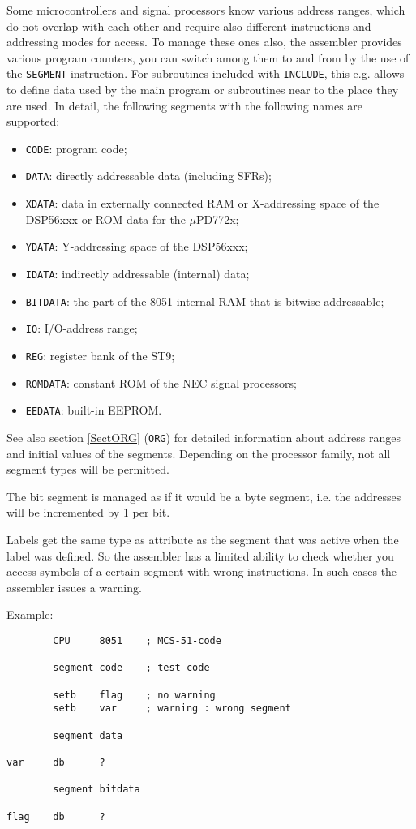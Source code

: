 \documentclass[12pt,twoside]{report}
\newcommand{\tty}[1]{{\tt #1}}
\begin{document}
Some microcontrollers and signal processors know various address ranges,
which do not overlap with each other and require also different
instructions and addressing modes for access.  To manage these ones also,
the assembler provides various program counters, you can switch among
them to and from by the use of the \tty{SEGMENT} instruction.  For subroutines
included with \tty{INCLUDE}, this e.g. allows to define data used by the
main program or subroutines near to the place they are used.  In detail,
the following segments with the following names are supported:
\begin{itemize}
\item{\tty{CODE}: program code;}
\item{\tty{DATA}: directly addressable data (including SFRs);}
\item{\tty{XDATA}: data in externally connected RAM or
      X-addressing space of the DSP56xxx or ROM data for the $\mu$PD772x;}
\item{\tty{YDATA}: Y-addressing space of the DSP56xxx;}
\item{\tty{IDATA}: indirectly addressable (internal) data; }
\item{\tty{BITDATA}: the part of the 8051-internal RAM that is bitwise
      addressable;}
\item{\tty{IO}: I/O-address range;}
\item{\tty{REG}: register bank of the ST9;}
\item{\tty{ROMDATA}: constant ROM of the NEC signal processors;}
\item{\tty{EEDATA}: built-in EEPROM.}
\end{itemize}
See also section \ref{SectORG} (\tty{ORG}) for detailed information about
address ranges and initial values of the segments. Depending on the
processor family, not all segment types will be permitted.

The bit segment is managed as if it would be a byte segment, i.e. the
addresses will be incremented by 1 per bit.

Labels get the same type as attribute as the segment that was active
when the label was defined.  So the assembler has a limited ability
to check whether you access symbols of a certain segment with wrong
instructions.  In such cases the assembler issues a warning.

Example:
\begin{verbatim}
        CPU     8051    ; MCS-51-code

        segment code    ; test code

        setb    flag    ; no warning
        setb    var     ; warning : wrong segment

        segment data

var     db      ?

        segment bitdata

flag    db      ?
\end{verbatim}
\end{document}
